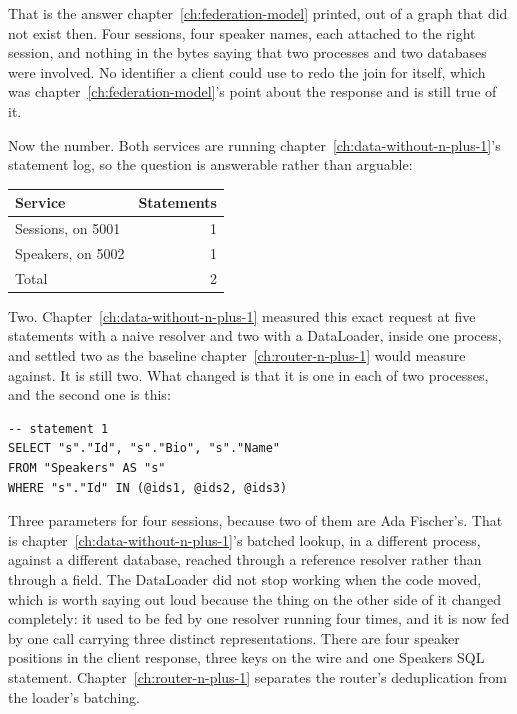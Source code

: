 %
That is the answer chapter~\ref{ch:federation-model} printed, out of a graph
that did not exist then. Four sessions, four speaker names, each attached to
the right session, and nothing in the bytes saying that two processes and two
databases were involved. No identifier a client could use to redo the join for
itself, which was chapter~\ref{ch:federation-model}'s point about the response
and is still true of it.

%
Now the number. Both services are running
chapter~\ref{ch:data-without-n-plus-1}'s statement log, so the question is
answerable rather than arguable:

\begin{center}
\begin{tabular}{lr}
\toprule
Service & Statements \\
\midrule
Sessions, on 5001 & 1 \\
Speakers, on 5002 & 1 \\
\midrule
Total & 2 \\
\bottomrule
\end{tabular}
\end{center}

%
Two. Chapter~\ref{ch:data-without-n-plus-1} measured this exact request at five
statements with a naive resolver and two with a DataLoader, inside one process,
and settled two as the baseline chapter~\ref{ch:router-n-plus-1} would measure
against. It is still two. What changed is that it is one in each of two
processes, and the second one is this:

\begin{verbatim}
-- statement 1
SELECT "s"."Id", "s"."Bio", "s"."Name"
FROM "Speakers" AS "s"
WHERE "s"."Id" IN (@ids1, @ids2, @ids3)
\end{verbatim}

%
Three parameters for four sessions, because two of them are Ada Fischer's.
That is chapter~\ref{ch:data-without-n-plus-1}'s batched lookup, in a different
process, against a different database, reached through a reference resolver
rather than through a field. The DataLoader did not stop working when the code
moved, which is worth saying out loud because the thing on the other side of it
changed completely: it used to be fed by one resolver running four times, and
it is now fed by one  call carrying three distinct
representations. There are four speaker positions in the client response,
three keys on the wire and one Speakers SQL statement. Chapter~\ref{ch:router-n-plus-1}
separates the router's deduplication from the loader's batching.

